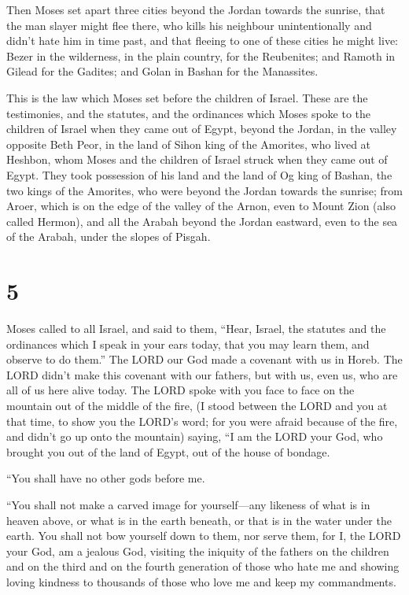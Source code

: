  Then Moses set apart three cities beyond the Jordan
towards the sunrise,  that the man slayer might flee
there, who kills his neighbour unintentionally and didn't hate him in
time past, and that fleeing to one of these cities he might live:
 Bezer in the wilderness, in the plain country, for the
Reubenites; and Ramoth in Gilead for the Gadites; and Golan in Bashan
for the Manassites.

 This is the law which Moses set before the children of
Israel.  These are the testimonies, and the statutes, and
the ordinances which Moses spoke to the children of Israel when they
came out of Egypt,  beyond the Jordan, in the valley
opposite Beth Peor, in the land of Sihon king of the Amorites, who lived
at Heshbon, whom Moses and the children of Israel struck when they came
out of Egypt.  They took possession of his land and the
land of Og king of Bashan, the two kings of the Amorites, who were
beyond the Jordan towards the sunrise;  from Aroer, which
is on the edge of the valley of the Arnon, even to Mount Zion (also
called Hermon),  and all the Arabah beyond the Jordan
eastward, even to the sea of the Arabah, under the slopes of Pisgah.

\hypertarget{section-4}{%
\section{5}\label{section-4}}

 Moses called to all Israel, and said to them, ``Hear,
Israel, the statutes and the ordinances which I speak in your ears
today, that you may learn them, and observe to do them.'' 
The LORD our God made a covenant with us in Horeb.  The
LORD didn't make this covenant with our fathers, but with us, even us,
who are all of us here alive today.  The LORD spoke with
you face to face on the mountain out of the middle of the fire,
 (I stood between the LORD and you at that time, to show
you the LORD's word; for you were afraid because of the fire, and didn't
go up onto the mountain) saying,  ``I am the LORD your
God, who brought you out of the land of Egypt, out of the house of
bondage.

 ``You shall have no other gods before me.

 ``You shall not make a carved image for yourself---any
likeness of what is in heaven above, or what is in the earth beneath, or
that is in the water under the earth.  You shall not bow
yourself down to them, nor serve them, for I, the LORD your God, am a
jealous God, visiting the iniquity of the fathers on the children and on
the third and on the fourth generation of those who hate me
 and showing loving kindness to thousands of those who
love me and keep my commandments.

